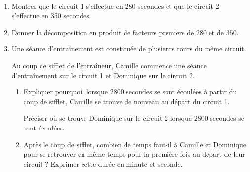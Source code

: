 \documentclass[11pt]{article}
\begin{document}
\begin{center}
\hfill~

\end{center}

\begin{enumerate}
\item Montrer que le circuit 1 s'effectue en 280 secondes et que le circuit 2 s'effectue en 350 secondes.
\item Donner la décomposition en produit de facteurs premiers de $280$ et de $350$.
\item Une séance d'entraînement est constituée de plusieurs tours du même circuit.

Au coup de sifflet de l'entraîneur, Camille commence une séance d'entraînement sur le circuit 1 et Dominique sur le circuit 2.

	\begin{enumerate}
		\item Expliquer pourquoi, lorsque \num{2800} secondes se sont écoulées à partir du coup de sifflet, Camille se trouve de nouveau au départ du circuit 1.

		Préciser où se trouve Dominique sur le circuit 2 lorsque \num{2800} secondes se sont écoulées.

		\item Après le coup de sifflet, combien de temps faut-il à Camille et Dominique pour se retrouver en même temps pour la première fois au départ de leur circuit ? Exprimer cette durée en minute et seconde.
	\end{enumerate}
\end{enumerate}

\newpage
\end{document}
